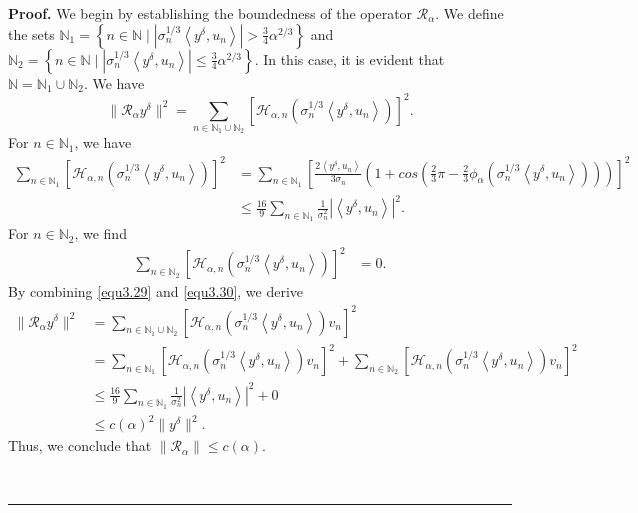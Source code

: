 \documentclass[a4paper,12pt]{article}
\numberwithin{equation}{section}
\newenvironment{proof}[1][Proof]{\textbf{#1.} }
{\ \rule{0.75em}{0.75em}\smallskip}
\begin{document}
\begin{proof}
    We begin by establishing the boundedness of the operator $\mathcal{R}_{\alpha}$. We define the sets $\mathbb{N}_{1}=\left\{n\in\mathbb{N}\mid\left|\sigma_{n}^{1/3}\left<y^{\delta},u_{n}\right>\right| > \frac{3}{4}\alpha^{2/3}\right\}$ and $\mathbb{N}_{2}=\left\{n\in\mathbb{N}\mid \left|\sigma_{n}^{1/3}\left<y^{\delta},u_{n}\right>\right| \leq \frac{3}{4}\alpha^{2/3}\right\}$. In this case, it is evident that $\mathbb{N}=\mathbb{N}_{1}\cup\mathbb{N}_{2}$. We have  
    \begin{equation*}
        \|\mathcal{R}_{\alpha}y^{\delta}\|^2=\sum_{n\in\mathbb{N}_{1}\cup\mathbb{N}_{2}} \left[\mathcal{H}_{\alpha,n}\left(\sigma_{n}^{1/3}\left<y^{\delta}, u_{n}\right>\right)\right]^2.
    \end{equation*}
    For $n\in\mathbb{N}_{1}$, we have
    \begin{align}\label{equ3.29}
        \sum_{n\in\mathbb{N}_{1}}\left[\mathcal{H}_{\alpha,n}\left(\sigma_{n}^{1/3}\left<y^{\delta}, u_{n}\right>\right)\right]^2
        & =\sum_{n\in\mathbb{N}_{1}}\left[\frac{2 \left<y^{\delta}, u_{n}\right>}{3\sigma_{n}}\left(1+cos\left(\frac{2}{3}\pi-\frac{2}{3}\phi_{\alpha}\left( \sigma_{n}^{1/3}\left<y^{\delta}, u_{n}\right>\right)\right)\right)\right]^2 \nonumber\\
        & \leq \frac{16}{9}\sum_{n\in\mathbb{N}_{1}} \frac{1}{\sigma_{n}^{2}}|\left<y^{\delta},u_{n}\right>|^2.
    \end{align}
    For $n\in\mathbb{N}_{2}$, we find
    \begin{align}\label{equ3.30}
        \sum_{n\in\mathbb{N}_{2}}\left[\mathcal{H}_{\alpha,n}\left(\sigma_{n}^{1/3}\left<y^{\delta}, u_{n}\right>\right)\right]^2
        & =0.
    \end{align}
    By combining \eqref{equ3.29} and \eqref{equ3.30}, we derive
    \begin{align*}
        \|\mathcal{R}_{\alpha}y^{\delta}\|^{2}
        & = \sum_{n\in\mathbb{N}_{1}\cup\mathbb{N}_{2}}\left[\mathcal{H}_{\alpha,n}\left(\sigma_{n}^{1/3}\left<y^{\delta}, u_{n}\right>\right)v_{n}\right]^2 \\ 
        & =  \sum_{n\in\mathbb{N}_{1}}\left[\mathcal{H}_{\alpha,n}\left(\sigma_{n}^{1/3}\left<y^{\delta}, u_{n}\right>\right)v_{n}\right]^2+\sum_{n\in\mathbb{N}_{2}}\left[\mathcal{H}_{\alpha,n}\left(\sigma_{n}^{1/3}\left<y^{\delta}, u_{n}\right>\right)v_{n}\right]^2 \\
        & \leq \frac{16}{9}\sum_{n\in\mathbb{N}_{1}} \frac{1}{\sigma_{n}^{2}}|\left<y^{\delta},u_{n}\right>|^2+0 \\
        & \leq c(\alpha)^{2}\|y^{\delta}\|^{2}.
    \end{align*}
    Thus, we conclude that $\|\mathcal{R}_{\alpha}\|\leq c(\alpha)$.
    

\end{proof}
\end{document}
